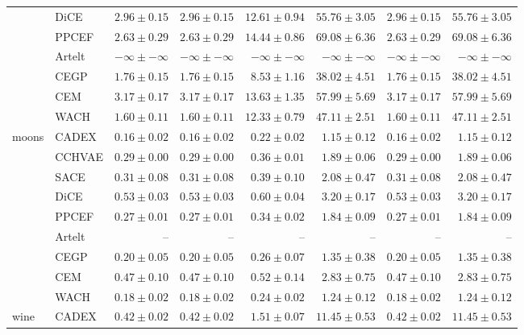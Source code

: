 \begin{table}[ht]
\begin{center}
\begin{sc}
\begin{scriptsize}
\begin{tabular}{l|l|rrrrrr}
 & DiCE & $2.96\pm{0.15}$ & $2.96\pm{0.15}$ & $12.61\pm{0.94}$ & $55.76\pm{3.05}$ & $2.96\pm{0.15}$ & $55.76\pm{3.05}$ \\
 & PPCEF & $2.63\pm{0.29}$ & $2.63\pm{0.29}$ & $14.44\pm{0.86}$ & $69.08\pm{6.36}$ & $2.63\pm{0.29}$ & $69.08\pm{6.36}$ \\
 & Artelt & $-\infty\pm{-\infty}$ & $-\infty\pm{-\infty}$ & $-\infty\pm{-\infty}$ & $-\infty\pm{-\infty}$ & $-\infty\pm{-\infty}$ & $-\infty\pm{-\infty}$ \\
 & CEGP & $1.76\pm{0.15}$ & $1.76\pm{0.15}$ & $\boldsymbol{8.53\pm{1.16}}$ & $\boldsymbol{38.02\pm{4.51}}$ & $1.76\pm{0.15}$ & $\boldsymbol{38.02\pm{4.51}}$ \\
 & CEM & $3.17\pm{0.17}$ & $3.17\pm{0.17}$ & $13.63\pm{1.35}$ & $57.99\pm{5.69}$ & $3.17\pm{0.17}$ & $57.99\pm{5.69}$ \\
 & WACH & $1.60\pm{0.11}$ & $1.60\pm{0.11}$ & $12.33\pm{0.79}$ & $47.11\pm{2.51}$ & $1.60\pm{0.11}$ & $47.11\pm{2.51}$ \\
\midrule
\multirow{9}{*}{moons} & CADEX & $\boldsymbol{0.16\pm{0.02}}$ & $\boldsymbol{0.16\pm{0.02}}$ & $\boldsymbol{0.22\pm{0.02}}$ & $\boldsymbol{1.15\pm{0.12}}$ & $\boldsymbol{0.16\pm{0.02}}$ & $\boldsymbol{1.15\pm{0.12}}$ \\
 & CCHVAE & $0.29\pm{0.00}$ & $0.29\pm{0.00}$ & $0.36\pm{0.01}$ & $1.89\pm{0.06}$ & $0.29\pm{0.00}$ & $1.89\pm{0.06}$ \\
 & SACE & $0.31\pm{0.08}$ & $0.31\pm{0.08}$ & $0.39\pm{0.10}$ & $2.08\pm{0.47}$ & $0.31\pm{0.08}$ & $2.08\pm{0.47}$ \\
 & DiCE & $0.53\pm{0.03}$ & $0.53\pm{0.03}$ & $0.60\pm{0.04}$ & $3.20\pm{0.17}$ & $0.53\pm{0.03}$ & $3.20\pm{0.17}$ \\
 & PPCEF & $0.27\pm{0.01}$ & $0.27\pm{0.01}$ & $0.34\pm{0.02}$ & $1.84\pm{0.09}$ & $0.27\pm{0.01}$ & $1.84\pm{0.09}$ \\
 & Artelt & -- & -- & -- & -- & -- & -- \\
 & CEGP & $0.20\pm{0.05}$ & $0.20\pm{0.05}$ & $0.26\pm{0.07}$ & $1.35\pm{0.38}$ & $0.20\pm{0.05}$ & $1.35\pm{0.38}$ \\
 & CEM & $0.47\pm{0.10}$ & $0.47\pm{0.10}$ & $0.52\pm{0.14}$ & $2.83\pm{0.75}$ & $0.47\pm{0.10}$ & $2.83\pm{0.75}$ \\
 & WACH & $0.18\pm{0.02}$ & $0.18\pm{0.02}$ & $0.24\pm{0.02}$ & $1.24\pm{0.12}$ & $0.18\pm{0.02}$ & $1.24\pm{0.12}$ \\
\midrule
\multirow{9}{*}{wine} & CADEX & $0.42\pm{0.02}$ & $0.42\pm{0.02}$ & $1.51\pm{0.07}$ & $11.45\pm{0.53}$ & $0.42\pm{0.02}$ & $11.45\pm{0.53}$ \\

\end{tabular}
\end{scriptsize}
\end{sc}
\end{center}
\end{table}
